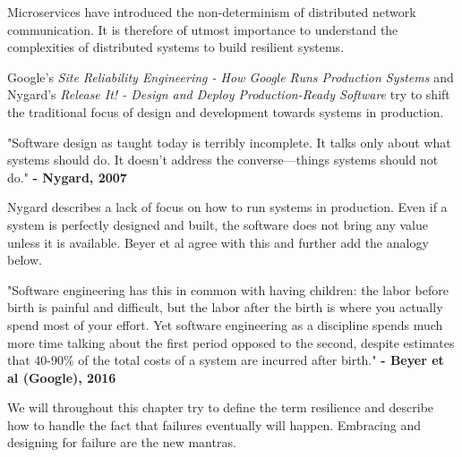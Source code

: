 \begin{theorem}
    Microservices have introduced the non-determinism of distributed network communication. It is therefore of utmost importance to understand the complexities of distributed systems to build resilient systems. 
    
\end{theorem}

\noindent
Google's \textit{Site Reliability Engineering - How Google Runs Production Systems} and Nygard's \textit{Release It! - Design and Deploy Production-Ready Software} try to shift the traditional focus of design and development towards systems in production.

\begin{citat} []
 "Software design as taught today is terribly incomplete. It talks only about what systems should do. It doesn’t address the converse—things systems should not do." \textbf{- Nygard, 2007} \cite[p. 1]{nygard2007release}
\end{citat}

\noindent
Nygard describes a lack of focus on how to run systems in production. 
Even if a system is perfectly designed and built, the software does not bring any value unless it is available. Beyer et al agree with this and further add the analogy below.

\begin{citat} []
 "Software engineering has this in common with having children: the labor before birth is painful and difficult, but the labor after the birth is where you actually spend most of your effort. Yet software engineering as a discipline spends much more time talking about the first period opposed to the second, despite estimates that 40-90\% of the total costs of a system are incurred after birth." \textbf{- Beyer et al (Google), 2016} \cite[p. xv]{beyer2016site}
\end{citat}

\noindent
We will throughout this chapter try to define the term resilience and describe how to handle the fact that failures eventually will happen. Embracing and designing for failure are the new mantras.